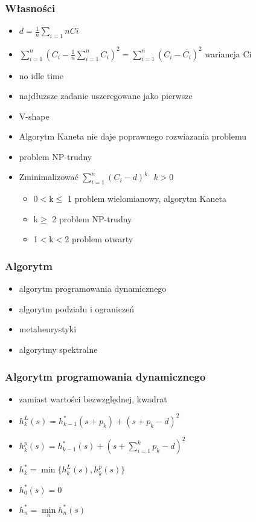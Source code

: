 \documentclass[12pt,a4paper]{article}
\begin{document}
\subsubsection{Własności}
\begin{itemize}
\item $d=\frac{1}{n}\sum\limits_{i=1}{n}Ci$
\item $\sum\limits_{i=1}^{n}(C_{i}-\frac{1}{n}\sum\limits_{i=1}^{n}C_{i})^2 = \sum\limits_{i=1}^{n}(C_{i}- \bar{C_{i}})^2$ wariancja Ci
\item no idle time
\item najdłuższe zadanie uszeregowane jako pierwsze
\item V-shape
\item Algorytm Kaneta nie daje poprawnego rozwiazania problemu
\item problem NP-trudny
\item Zminimalizować $\sum\limits_{i=1}^{n}(C_{i}-d)^k\ \ \  k>0$
\begin{itemize}
\item 0$<$k$\leq$ 1 problem wielomianowy, algorytm Kaneta
\item k$\geq$ 2 problem NP-trudny
\item 1$<$k$<$2 problem otwarty
\end{itemize}
\end{itemize}
\subsubsection{Algorytm}
\begin{itemize}
\item algorytm programowania dynamicznego
\item algorytm podziału i ograniczeń
\item metaheurystyki
\item algorytmy spektralne 
\end{itemize}
\subsubsection{Algorytm programowania dynamicznego}
\begin{itemize}
\item zamiast wartości bezwzględnej, kwadrat
\item $h_{k}^{L}(s)= h_{k-1}^{*}(s+p_{k})+(s+p_{k}-d)^2$
\item $h_{k}^{p}(s)=h_{k-1}^{*}(s)+(s+\sum\limits_{i=1}^{k}p_{k} -d)^2$
\item $h_{k}^{*}= \min\{h_{k}^{L}(s),h_{k}^{p}(s)\}$
\item $h_{0}^{*}(s)=0$
\item $h_{n}^{*}= \min\limits_{n} h_{n}^{*}(s)$
\end{itemize}
\end{document}
